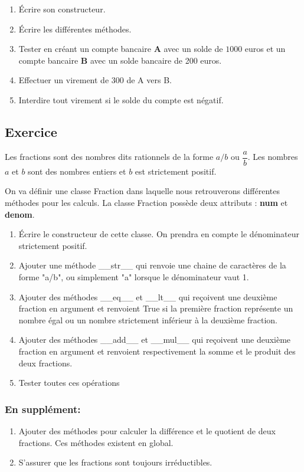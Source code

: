 \documentclass[11pt,a4paper]{article}
\newcounter{numexo}
\begin{document}
\begin{enumerate}
\item Écrire son constructeur.
\item Écrire les différentes méthodes.
\item Tester en créant un compte bancaire \textbf{A} avec un solde de $1000$ euros et un compte bancaire \textbf{B} avec un solde bancaire de 200 euros.
\item Effectuer un virement de 300 de A vers B.
\item Interdire tout virement si le solde du compte est négatif.
\end{enumerate}


\addtocounter{numexo}{1}
\subsection*{\Large Exercice \thenumexo}
Les fractions sont des nombres dits rationnels de la forme $a/b$ ou $\dfrac{a}{b}$. Les nombres $a$ et $b$ sont des nombres entiers et $b$ est strictement positif.

On va définir une classe Fraction dans laquelle nous retrouverons différentes méthodes pour les calculs. La classe Fraction possède deux attributs : \textbf{num} et \textbf{denom}.


\begin{enumerate}
\item Écrire le constructeur de cette classe. On prendra en compte le dénominateur strictement positif.
\item Ajouter une méthode \_\_str\_\_ qui renvoie une chaine de caractères de la forme "a/b", ou simplement "a" lorsque le dénominateur vaut 1.
\item Ajouter des méthodes \_\_eq\_\_ et \_\_lt\_\_ qui reçoivent une deuxième fraction en argument et renvoient True si la première fraction représente un nombre égal ou un nombre strictement inférieur à la deuxième fraction.
\item Ajouter des méthodes \_\_add\_\_ et \_\_mul\_\_ qui reçoivent une deuxième fraction en argument et renvoient respectivement la somme et le produit des deux fractions.
\item Tester toutes ces opérations
\end{enumerate} 
\subsubsection*{En supplément:}
\begin{enumerate}
\item Ajouter des méthodes pour calculer la différence et le quotient de deux fractions. Ces méthodes existent en global.
\item S'assurer que les fractions sont toujours irréductibles.
\end{enumerate}
\end{document}
